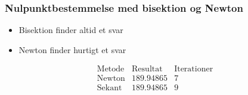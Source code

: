 \begin{frame}
\frametitle{Nulpunktbestemmelse med \phantom{Heeekjjjjeej} bisektion og Newton}
\begin{itemize}
\item Bisektion finder altid et svar
\item Newton finder hurtigt et svar
\end{itemize}

$$\begin{array}{l|c|c}
\text{Metode} & \text{Resultat} & \text{Iterationer}\\
\hline
\text{Newton}		& 189.94865 & 7\\
\text{Sekant}		& 189.94865 & 9
\end{array}$$
\end{frame}